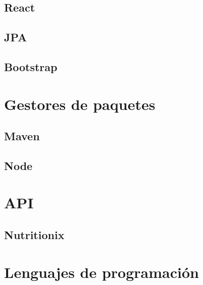 
\subsection{React}


\subsection{JPA}


\subsection{Bootstrap}


\section{Gestores de paquetes}


\subsection{Maven}


\subsection{Node}


\section{API}


\subsection{Nutritionix}


\section{Lenguajes de programación}

